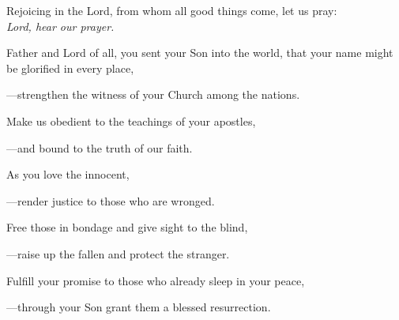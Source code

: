 \intercessions\indent

\begin{hangpar}

Rejoicing in the Lord, from whom all good things come, let us pray:\\
\emph{Lord, hear our prayer.}

\medskip Father and Lord of all, you sent your Son into the world, that your name might be glorified in every place,

{\color{red}---\thinspace}strengthen the witness of your Church among the nations.

\medskip Make us obedient to the teachings of your apostles,

{\color{red}---\thinspace}and bound to the truth of our faith.

\medskip As you love the innocent,

{\color{red}---\thinspace}render justice to those who are wronged.

\medskip Free those in bondage and give sight to the blind,

{\color{red}---\thinspace}raise up the fallen and protect the stranger.

\medskip Fulfill your promise to those who already sleep in your peace,

{\color{red}---\thinspace}through your Son grant them a blessed resurrection.

\end{hangpar}

